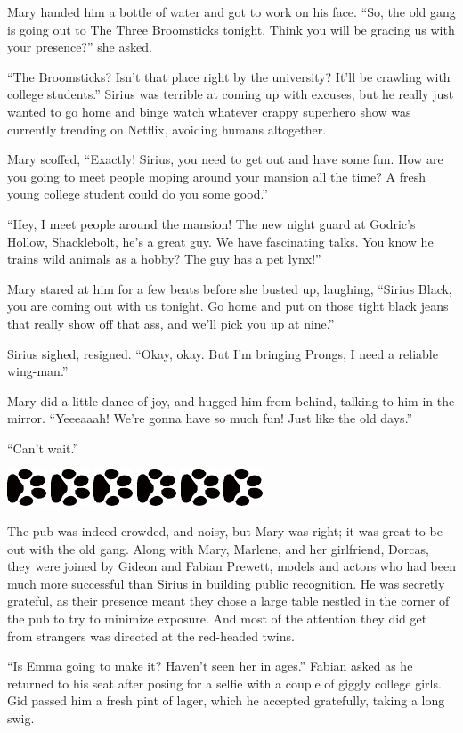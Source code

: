\documentclass[12pt,twoside,openright]{memoir}
\newcommand{\myrulez}{	
	\begin{center}
		\hspace{.5em}
		\includegraphics[angle=60]{dogprint.pdf}
		\hspace{.5em}
		\includegraphics[angle=120]{dogprint.pdf}
		\hspace{.5em}
		\includegraphics[angle=60]{dogprint.pdf}
		\hspace{.5em}
		\includegraphics[angle=120]{dogprint.pdf}
		\hspace{.5em}
		\includegraphics[angle=60]{dogprint.pdf}
		\hspace{.5em}
		\includegraphics[angle=120]{dogprint.pdf}
		\hspace{.5em}
	\end{center}
}
\begin{document}
Mary handed him a bottle of water and got to work on his face. ``So, the old gang is going out to The Three Broomsticks tonight. Think you will be gracing us with your presence?'' she asked.

``The Broomsticks? Isn't that place right by the university? It'll be crawling with college students.'' Sirius was terrible at coming up with excuses, but he really just wanted to go home and binge watch whatever crappy superhero show was currently trending on Netflix, avoiding humans altogether. 

Mary scoffed, ``Exactly! Sirius, you need to get out and have some fun. How are you going to meet people moping around your mansion all the time? A fresh young college student could do you some good.'' 

``Hey, I meet people around the mansion! The new night guard at Godric's Hollow, Shacklebolt, he's a great guy. We have fascinating talks. You know he trains wild animals as a hobby? The guy has a pet lynx!'' 

Mary stared at him for a few beats before she busted up, laughing, ``Sirius Black, you are coming out with us tonight. Go home and put on those tight black jeans that really show off that ass, and we'll pick you up at nine.'' 

Sirius sighed, resigned. ``Okay, okay. But I'm bringing Prongs, I need a reliable wing-man.'' 

Mary did a little dance of joy, and hugged him from behind, talking to him in the mirror. ``Yeeeaaah! We're gonna have so much fun! Just like the old days.'' 

``Can't wait.'' 

\myrulez

The pub was indeed crowded, and noisy, but Mary was right; it was great to be out with the old gang. Along with Mary, Marlene, and her girlfriend, Dorcas, they were joined by Gideon and Fabian Prewett, models and actors who had been much more successful than Sirius in building public recognition. He was secretly grateful, as their presence meant they chose a large table nestled in the corner of the pub to try to minimize exposure. And most of the attention they did get from strangers was directed at the red-headed twins. 

``Is Emma going to make it? Haven't seen her in ages.'' Fabian asked as he returned to his seat after posing for a selfie with a couple of giggly college girls. Gid passed him a fresh pint of lager, which he accepted gratefully, taking a long swig. 
\end{document}
